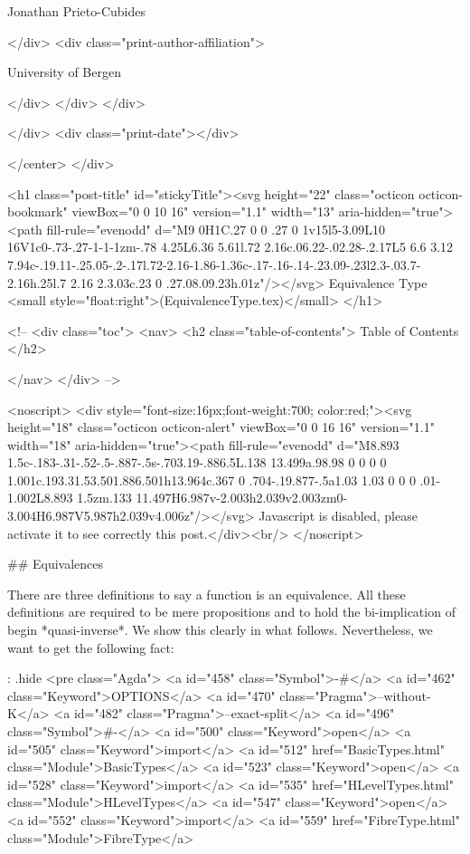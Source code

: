                   Jonathan Prieto-Cubides
                
              </div>
              <div class="print-author-affiliation">
                
                  University of Bergen
                
                </div>
            </div>
          </div>
          
          
        </div>
        <div class="print-date"></div>
        
        
    </center>
  </div>

  

  <h1 class="post-title" id="stickyTitle"><svg height="22" class="octicon octicon-bookmark" viewBox="0 0 10 16" version="1.1" width="13" aria-hidden="true"><path fill-rule="evenodd" d="M9 0H1C.27 0 0 .27 0 1v15l5-3.09L10 16V1c0-.73-.27-1-1-1zm-.78 4.25L6.36 5.61l.72 2.16c.06.22-.02.28-.2.17L5 6.6 3.12 7.94c-.19.11-.25.05-.2-.17l.72-2.16-1.86-1.36c-.17-.16-.14-.23.09-.23l2.3-.03.7-2.16h.25l.7 2.16 2.3.03c.23 0 .27.08.09.23h.01z"/></svg> Equivalence Type <small style="float:right">(EquivalenceType.tex)</small>
  </h1>

  <!-- 
  <div class="toc">
    <nav>
    <h2 class="table-of-contents"> Table of Contents </h2>
      

    </nav>
  </div>
   -->

  <noscript>
  <div style="font-size:16px;font-weight:700; color:red;"><svg height="18" class="octicon octicon-alert" viewBox="0 0 16 16" version="1.1" width="18" aria-hidden="true"><path fill-rule="evenodd" d="M8.893 1.5c-.183-.31-.52-.5-.887-.5s-.703.19-.886.5L.138 13.499a.98.98 0 0 0 0 1.001c.193.31.53.501.886.501h13.964c.367 0 .704-.19.877-.5a1.03 1.03 0 0 0 .01-1.002L8.893 1.5zm.133 11.497H6.987v-2.003h2.039v2.003zm0-3.004H6.987V5.987h2.039v4.006z"/></svg> Javascript is disabled, please activate it to see correctly this post.</div><br/>
  </noscript>

  ## Equivalences

There are three definitions to say a function is an equivalence. All these
definitions are required to be mere propositions and to hold the
bi-implication of begin *quasi-inverse*. We show this clearly in what follows.
Nevertheless, we want to get the following fact:


{: .hide}
<pre class="Agda">
<a id="458" class="Symbol">{-#</a> <a id="462" class="Keyword">OPTIONS</a> <a id="470" class="Pragma">--without-K</a> <a id="482" class="Pragma">--exact-split</a> <a id="496" class="Symbol">#-}</a>
<a id="500" class="Keyword">open</a> <a id="505" class="Keyword">import</a> <a id="512" href="BasicTypes.html" class="Module">BasicTypes</a>
<a id="523" class="Keyword">open</a> <a id="528" class="Keyword">import</a> <a id="535" href="HLevelTypes.html" class="Module">HLevelTypes</a>
<a id="547" class="Keyword">open</a> <a id="552" class="Keyword">import</a> <a id="559" href="FibreType.html" class="Module">FibreType</a>

